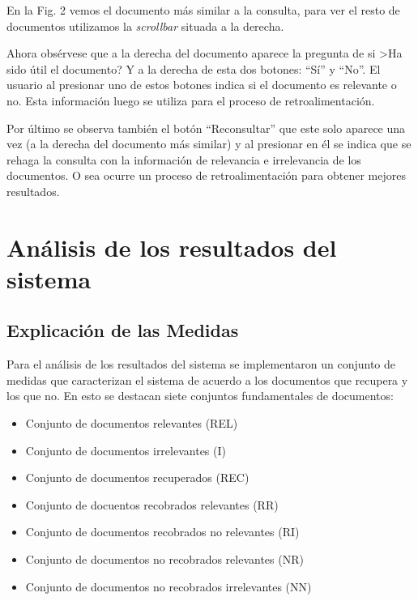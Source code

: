 \documentclass[runningheads]{llncs}
\begin{document}
	En la Fig. 2 vemos el documento m\'as similar a la consulta, para ver el resto de documentos utilizamos la \textit{scrollbar} situada a la derecha.
	
	Ahora obs\'ervese que a la derecha del documento aparece la pregunta de si >Ha sido \'util el documento? Y a la derecha de esta dos botones: ``S\'i'' y ``No''. El usuario al presionar uno de estos botones indica si el documento es relevante o no. Esta informaci\'on luego se utiliza para el proceso de retroalimentaci\'on.
	
	Por \'ultimo se observa tambi\'en el bot\'on ``Reconsultar'' que este solo aparece una vez (a la derecha del documento m\'as similar) y al presionar en \'el se indica que se rehaga la consulta con la informaci\'on de relevancia e irrelevancia de los documentos. O sea ocurre un proceso de retroalimentaci\'on para obtener mejores resultados.
	
	\section{An\'alisis de los resultados del sistema}
	\subsection{Explicaci\'on de las Medidas}
	Para el an\'alisis de los resultados del sistema se implementaron un conjunto de medidas que caracterizan el sistema de acuerdo a los documentos que recupera y los que no. En esto se destacan siete conjuntos fundamentales de documentos:
	\begin{itemize}
	\item Conjunto de documentos relevantes (REL)
	\item Conjunto de documentos irrelevantes (I)
	\item Conjunto de documentos recuperados (REC)
	\item Conjunto de docuentos recobrados relevantes (RR)
	\item Conjunto de documentos recobrados no relevantes (RI)
	\item Conjunto de documentos no recobrados relevantes (NR)
	\item Conjunto de documentos no recobrados irrelevantes (NN)
	\end{itemize}
	
\end{document}
